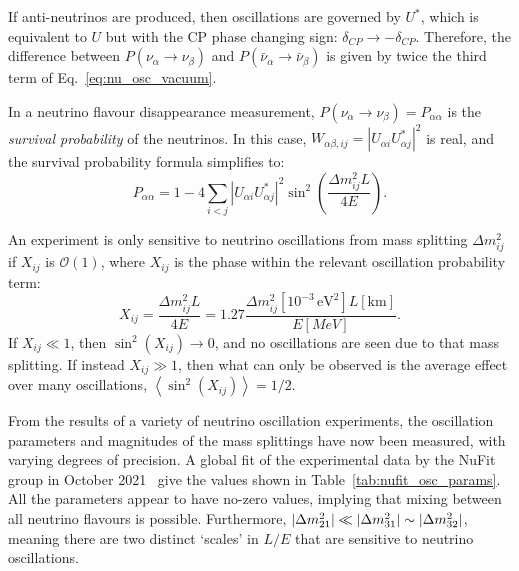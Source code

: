 If anti-neutrinos are produced, then oscillations are governed by $U^{*}$, which is equivalent to $U$ but with the CP phase changing sign: $\delta_{CP}\to -\delta_{CP}$. Therefore, the difference between $P\left(\nu_{\alpha}\to\nu_{\beta}\right)$ and $P\left(\bar{\nu}_{\alpha}\to\bar{\nu}_{\beta}\right)$ is given by twice the third term of Eq.~\ref{eq:nu_osc_vacuum}.

In a neutrino flavour disappearance measurement, $P\left(\nu_{\alpha}\to\nu_{\beta}\right) = P_{\alpha\alpha}$ is the \textit{survival probability} of the neutrinos. In this case, $W_{\alpha\beta,ij} = |U_{\alpha i}U_{\alpha j}^{*}|^{2}$ is real, and the survival probability formula simplifies to:
\begin{equation}
    P_{\alpha\alpha} = 1 
    - 4\sum_{i<j}|U_{\alpha i}U_{\alpha j}^{*}|^{2}\sin^{2}\left(\frac{\Delta m^{2}_{ij}L}{4E}\right).
\end{equation}

An experiment is only sensitive to neutrino oscillations from mass splitting $\Delta m^{2}_{ij}$ if $X_{ij}$ is $\mathcal{O}(1)$, where $X_{ij}$ is the phase within the relevant oscillation probability term:
\begin{equation}\label{eq:nu_osc_phase}
    X_{ij} = \frac{\Delta m^{2}_{ij} L}{4E} = 1.27 \frac{\Delta m^{2}_{ij} [10^{-3}\,\si{\eV\squared}] L [\si{\km}]}{E [\si{MeV}]}.
\end{equation}
If $X_{ij}\ll 1$, then $\sin^{2}\left(X_{ij}\right)\to 0$, and no oscillations are seen due to that mass splitting. If instead $X_{ij}\gg 1$, then what can only be observed is the average effect over many oscillations, $\left<\sin^{2}\left(X_{ij}\right)\right> = 1/2$.

From the results of a variety of neutrino oscillation experiments, the oscillation parameters and magnitudes of the mass splittings have now been measured, with varying degrees of precision. A global fit of the experimental data by the NuFit group in October 2021~\cite{estebanFateHintsUpdated2020} give the values shown in Table~\ref{tab:nufit_osc_params}. All the parameters appear to have no-zero values, implying that mixing between all neutrino flavours is possible. Furthermore, $|\Delta m^{2}_{21}{}|\ll|\Delta m^{2}_{31}|\sim|\Delta m^{2}_{32}|$, meaning there are two distinct `scales' in $L/E$ that are sensitive to neutrino oscillations.


